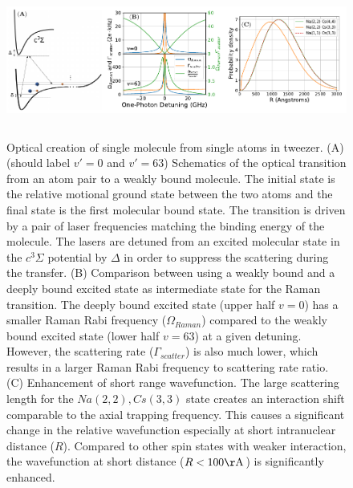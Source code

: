 \documentclass[aps,prl,twocolumn,groupedaddress]{revtex4-1}
\begin{document}
\begin{figure}
  \includegraphics[height=5cm]{fig1.pdf}
  \caption{Optical creation of single molecule from single atoms in tweezer.
    (A) (should label $v'=0$ and $v'=63$) Schematics of the optical transition from an atom pair to a weakly bound molecule.
    The initial state is the relative motional ground state between the two atoms
    and the final state is the first molecular bound state.
    The transition is driven by a pair of laser frequencies matching the binding energy
    of the molecule.
    The lasers are detuned from an excited molecular state in the $c^3\Sigma$ potential
    by $\Delta$ in order to suppress the scattering during the transfer.
    (B) Comparison between using a weakly bound and a deeply bound excited state
    as intermediate state for the Raman transition.
    The deeply bound excited state (upper half $v=0$) has a smaller Raman Rabi frequency ($\Omega_{Raman}$)
    compared to the weakly bound excited state (lower half $v=63$) at a given detuning.
    However, the scattering rate ($\Gamma_{scatter}$) is also much lower,
    which results in a larger Raman Rabi frequency to scattering rate ratio.
    (C) Enhancement of short range wavefunction.
    The large scattering length for the $Na(2,2),Cs(3,3)$ state creates an interaction shift
    comparable to the axial trapping frequency.
    This causes a significant change in the relative wavefunction especially at short
    intranuclear distance ($R$).
    Compared to other spin states with weaker interaction,
    the wavefunction at short distance ($R<100\mathrm{\AA}$) is significantly enhanced.
    \label{f-theory}
  }
\end{figure}





\end{document}
